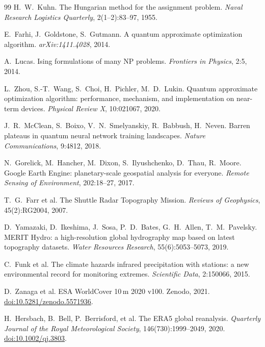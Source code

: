 \documentclass[journal]{IEEEtran}
\begin{document}
\begin{thebibliography}{99}
H.~W.~Kuhn.
The Hungarian method for the assignment problem.
\emph{Naval Research Logistics Quarterly}, 2(1--2):83--97, 1955.

E.~Farhi, J.~Goldstone, S.~Gutmann.
A quantum approximate optimization algorithm.
\emph{arXiv:1411.4028}, 2014.

A.~Lucas. Ising formulations of many NP problems.
\emph{Frontiers in Physics}, 2:5, 2014.

L.~Zhou, S.-T.~Wang, S.~Choi, H.~Pichler, M.~D.~Lukin.
Quantum approximate optimization algorithm: performance, mechanism, and
implementation on near-term devices.
\emph{Physical Review X}, 10:021067, 2020.

J.~R.~McClean, S.~Boixo, V.~N.~Smelyanskiy, R.~Babbush, H.~Neven.
Barren plateaus in quantum neural network training landscapes.
\emph{Nature Communications}, 9:4812, 2018.

N.~Gorelick, M.~Hancher, M.~Dixon, S.~Ilyushchenko, D.~Thau, R.~Moore.
Google Earth Engine: planetary-scale geospatial analysis for everyone.
\emph{Remote Sensing of Environment}, 202:18--27, 2017.

T.~G.~Farr et al.
The Shuttle Radar Topography Mission.
\emph{Reviews of Geophysics}, 45(2):RG2004, 2007.

D.~Yamazaki, D.~Ikeshima, J.~Sosa, P.~D.~Bates, G.~H.~Allen, T.~M.~Pavelsky.
MERIT Hydro: a high-resolution global hydrography map based on latest topography
datasets.
\emph{Water Resources Research}, 55(6):5053--5073, 2019.

C.~Funk et al.
The climate hazards infrared precipitation with stations: a new environmental
record for monitoring extremes.
\emph{Scientific Data}, 2:150066, 2015.

D.~Zanaga et al. ESA WorldCover 10\,m 2020 v100. Zenodo, 2021.
\href{https://doi.org/10.5281/zenodo.5571936}{doi:10.5281/zenodo.5571936}.

H.~Hersbach, B.~Bell, P.~Berrisford, et al.
The ERA5 global reanalysis.
\emph{Quarterly Journal of the Royal Meteorological Society}, 146(730):1999--2049, 2020.
\href{https://doi.org/10.1002/qj.3803}{doi:10.1002/qj.3803}.


\end{thebibliography}
\end{document}
